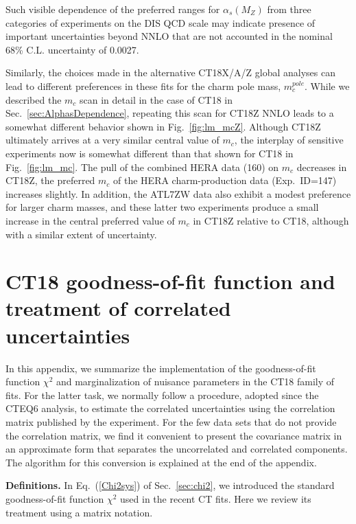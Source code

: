 Such visible dependence of the preferred ranges for $\alpha_s(M_Z)$
from three categories of experiments on the DIS QCD scale may
indicate presence of important uncertainties beyond NNLO that are not
accounted in the nominal 68\% C.L. uncertainty of 0.0027.

Similarly, the choices made in the alternative CT18X/A/Z global
analyses can lead to different preferences in these fits for the
charm pole mass, $m_c^{pole}$.
While we described the $m_c$ scan in detail 
in the case of CT18 in Sec.~\ref{sec:AlphasDependence},
repeating this scan for CT18Z NNLO leads to a somewhat different
behavior shown in Fig.~\ref{fig:lm_mcZ}.
Although CT18Z ultimately arrives at a very similar central value of
$m_c$, the interplay of sensitive
experiments now is somewhat different than that
shown for CT18 in Fig.~\ref{fig:lm_mc}.
The pull of the combined HERA data (160) on $m_c$
decreases in CT18Z, the preferred $m_c$
of the HERA charm-production data (Exp.~ID=147)
increases slightly. In addition, the ATL7ZW data
also exhibit a modest preference for larger charm masses, and
these latter two experiments produce a small increase in the
central preferred value of $m_c$ in CT18Z relative to CT18,
although with a similar extent of uncertainty.



\clearpage

\section{CT18 goodness-of-fit function and treatment of correlated uncertainties}
\label{sec:chi2_app}
%
%
\newcommand{\betamat}{b}

In this appendix, we summarize the implementation of the
goodness-of-fit function $\chi^2$ and marginalization of nuisance
parameters in the CT18 family of fits. For the latter task, we
normally follow a procedure, adopted since the CTEQ6 analysis, to
estimate the correlated uncertainties using the correlation matrix
published by the experiment. For the few data sets that do not provide
the correlation matrix, we find it convenient to present the
covariance matrix in an approximate form that separates the
uncorrelated and correlated components. The algorithm for this
conversion is explained at the end of the appendix.   


{\bf Definitions.}
In Eq.~(\ref{Chi2sys}) of Sec.~\ref{sec:chi2}, we introduced the standard
goodness-of-fit function $\chi^{2}$ used in the recent CT fits. Here
we review its treatment using a matrix notation.

